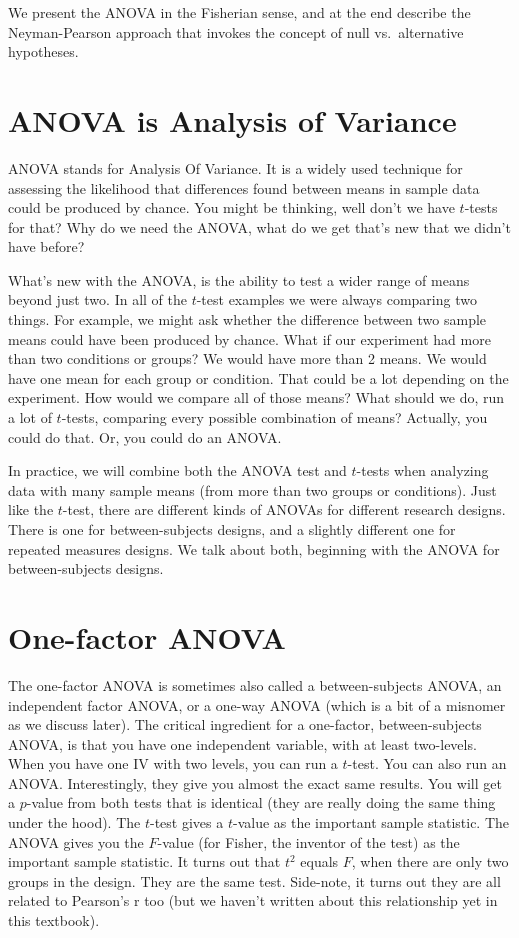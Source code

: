 \documentclass[
  letterpaper,
  DIV=11,
  numbers=noendperiod]{scrreprt}
\begin{document}
We present the ANOVA in the Fisherian sense, and at the end describe the
Neyman-Pearson approach that invokes the concept of null vs.~alternative
hypotheses.

\section{ANOVA is Analysis of
Variance}\label{anova-is-analysis-of-variance}

ANOVA stands for Analysis Of Variance. It is a widely used technique for
assessing the likelihood that differences found between means in sample
data could be produced by chance. You might be thinking, well don't we
have \(t\)-tests for that? Why do we need the ANOVA, what do we get
that's new that we didn't have before?

What's new with the ANOVA, is the ability to test a wider range of means
beyond just two. In all of the \(t\)-test examples we were always
comparing two things. For example, we might ask whether the difference
between two sample means could have been produced by chance. What if our
experiment had more than two conditions or groups? We would have more
than 2 means. We would have one mean for each group or condition. That
could be a lot depending on the experiment. How would we compare all of
those means? What should we do, run a lot of \(t\)-tests, comparing
every possible combination of means? Actually, you could do that. Or,
you could do an ANOVA.

In practice, we will combine both the ANOVA test and \(t\)-tests when
analyzing data with many sample means (from more than two groups or
conditions). Just like the \(t\)-test, there are different kinds of
ANOVAs for different research designs. There is one for between-subjects
designs, and a slightly different one for repeated measures designs. We
talk about both, beginning with the ANOVA for between-subjects designs.

\section{One-factor ANOVA}\label{one-factor-anova}

The one-factor ANOVA is sometimes also called a between-subjects ANOVA,
an independent factor ANOVA, or a one-way ANOVA (which is a bit of a
misnomer as we discuss later). The critical ingredient for a one-factor,
between-subjects ANOVA, is that you have one independent variable, with
at least two-levels. When you have one IV with two levels, you can run a
\(t\)-test. You can also run an ANOVA. Interestingly, they give you
almost the exact same results. You will get a \(p\)-value from both
tests that is identical (they are really doing the same thing under the
hood). The \(t\)-test gives a \(t\)-value as the important sample
statistic. The ANOVA gives you the \(F\)-value (for Fisher, the inventor
of the test) as the important sample statistic. It turns out that
\(t^2\) equals \(F\), when there are only two groups in the design. They
are the same test. Side-note, it turns out they are all related to
Pearson's r too (but we haven't written about this relationship yet in
this textbook).
\end{document}
